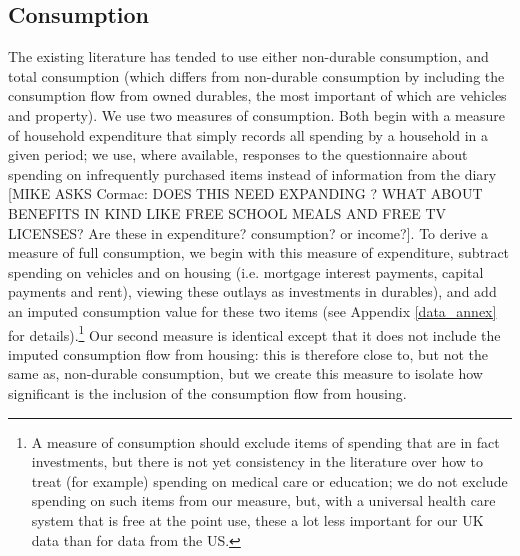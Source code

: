\subsection{Consumption}
The existing literature has tended to use either non-durable consumption, and total consumption (which differs from non-durable consumption by including the consumption flow from owned durables, the most important of which are vehicles and property). We use two measures of consumption. Both begin with a measure of household expenditure that simply records all spending by a household in a given period; we use, where available, responses to the questionnaire about spending on infrequently purchased items instead of information from the diary  [MIKE ASKS Cormac: DOES THIS NEED EXPANDING ? WHAT ABOUT BENEFITS IN KIND LIKE FREE SCHOOL MEALS AND FREE TV LICENSES? Are these in expenditure? consumption? or income?]. To derive a measure of full consumption, we begin with this measure of expenditure, subtract spending on vehicles and on housing (i.e. mortgage interest payments, capital payments and rent), viewing these outlays as investments in durables), and add an imputed consumption value for these two items (see Appendix \ref{data_annex} for details).\footnote{A measure of consumption should exclude items of spending that are in fact investments, but there is not yet consistency in the literature over how to treat (for example) spending on medical care or education; we do not exclude spending on such items from our measure, but, with a universal health care system that is free at the point use, these a lot less important for our UK data than for data from the US.} Our second measure is identical except that it does not include the imputed consumption flow from housing: this is therefore close to, but not the same as, non-durable consumption, but we create this measure to isolate how significant is the inclusion of the consumption flow from housing. 

